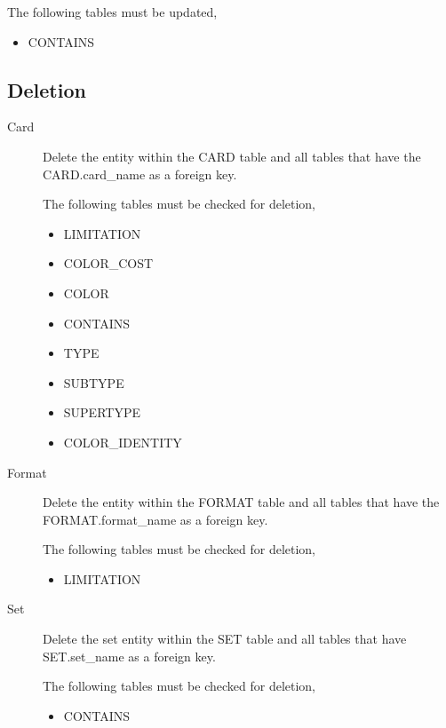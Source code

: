 \documentclass{article}
\begin{document}
\begin{description}
        The following tables must be updated,
        \begin{multicols}{3}
            \begin{itemize}
                \item CONTAINS
            \end{itemize}
        \end{multicols}
\end{description}

\subsection{Deletion}
\begin{description}
    \item[Card]
        Delete the entity within the CARD table and all tables that have the CARD.card\_name as a foreign key.

        The following tables must be checked for deletion,
        \begin{multicols}{3}
            \begin{itemize}
                \item LIMITATION
                \item COLOR\_COST
                \item COLOR
                \item CONTAINS
                \item TYPE
                \item SUBTYPE
                \item SUPERTYPE
                \item COLOR\_IDENTITY
            \end{itemize}
        \end{multicols}
    \item[Format]
        Delete the entity within the FORMAT table and all tables that have the FORMAT.format\_name as a foreign key.

        The following tables must be checked for deletion,
        \begin{multicols}{3}
            \begin{itemize}
                \item LIMITATION
            \end{itemize}
        \end{multicols}
    \item[Set]
        Delete the set entity within the SET table and all tables that have SET.set\_name as a foreign key.

        The following tables must be checked for deletion,
        \begin{multicols}{3}
            \begin{itemize}
                \item CONTAINS
            \end{itemize}
        \end{multicols}
\end{description}
\end{document}
